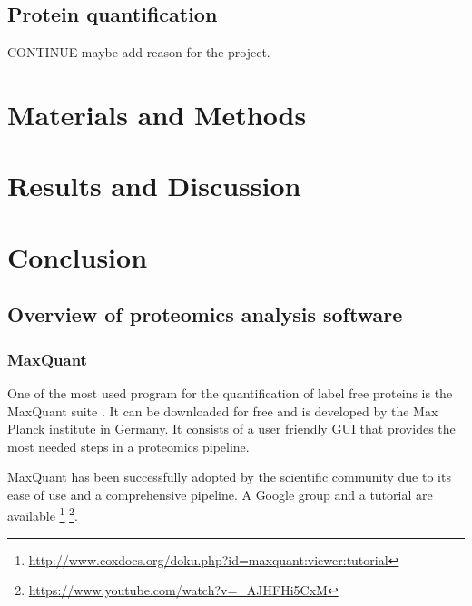 \documentclass[11pt, a4paper]{report}
\begin{document}
\section{Protein quantification}




CONTINUE maybe add reason for the project.

\chapter{Materials and Methods}

\chapter{Results and Discussion}

\chapter{Conclusion}








\section{Overview of proteomics analysis software}

\subsection{MaxQuant}

One of the most used program for the quantification of label free proteins is the MaxQuant suite \cite{Cox2008}. It can be downloaded for free and is developed by the Max Planck institute in Germany. It consists of a user friendly GUI that provides the most needed steps in a proteomics pipeline.

MaxQuant has been successfully adopted by the scientific community due to its ease of use and a comprehensive pipeline. A Google group and a tutorial are available  \footnote{\href{http://www.coxdocs.org/doku.php?id=maxquant:viewer:tutorial}{http://www.coxdocs.org/doku.php?id=maxquant:viewer:tutorial}} \footnote{\href{https://www.youtube.com/watch?v=\_AJHFHi5CxM}{https://www.youtube.com/watch?v=\_AJHFHi5CxM}}.
\end{document}

